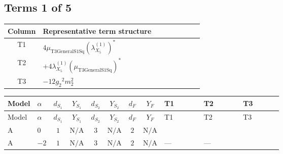 \documentclass[8pt]{article}
\begin{document}
\begin{landscape}
\subsection*{Terms 1 of 5}
\begin{center}
\begin{tabular}{@{}c >{\raggedright\arraybackslash}p{0.82\linewidth}@{}}
\toprule
Column & Representative term structure \\
\midrule
T1 & \(\displaystyle 4 {\mu_{\mathrm{T3GeneralS1Sq}}} \left({\lambda_{X_{5}}^{(1)}}\right)^{*}\) \\
\midrule
T2 & \(\displaystyle +4 {\lambda_{X_{5}}^{(1)}} \left({\mu_{\mathrm{T3GeneralS1Sq}}}\right)^{*}\) \\
\midrule
T3 & \(\displaystyle -12 {g_2}^2 {m_2^2}\) \\
\midrule
\bottomrule
\end{tabular}
\end{center}
\smallskip
\tiny
\begin{longtable}{@{}llcccccc >{\raggedright\arraybackslash}p{0.21\linewidth} >{\raggedright\arraybackslash}p{0.21\linewidth} >{\raggedright\arraybackslash}p{0.21\linewidth}@{}}
\toprule
Model & $\alpha$ & $d_{S_1}$ & $Y_{S_1}$ & $d_{S_2}$ & $Y_{S_2}$ & $d_F$ & $Y_F$ & T1 & T2 & T3 \\
\midrule
\endfirsthead
\toprule
Model & $\alpha$ & $d_{S_1}$ & $Y_{S_1}$ & $d_{S_2}$ & $Y_{S_2}$ & $d_F$ & $Y_F$ & T1 & T2 & T3 \\
\midrule
\endhead
A & $0$ & $1$ & $\text{N/A}$ & $3$ & $\text{N/A}$ & $2$ & $\text{N/A}$ & \scriptsize\adjustbox{max width=\linewidth}{$\begin{gathered} 4 {\mu_{\mathrm{T3GeneralS1Sq}}} \left({\lambda_{X_{5}}^{(1)}}\right)^{*}\end{gathered}$} & \scriptsize\adjustbox{max width=\linewidth}{$\begin{gathered} +4 {\lambda_{X_{5}}^{(1)}} \left({\mu_{\mathrm{T3GeneralS1Sq}}}\right)^{*}\end{gathered}$} & \scriptsize\adjustbox{max width=\linewidth}{$\begin{gathered} -12 {g_2}^2 {m_2^2}\end{gathered}$} \\
\midrule
A & $-2$ & $1$ & $\text{N/A}$ & $3$ & $\text{N/A}$ & $2$ & $\text{N/A}$ & --- & --- & \scriptsize\adjustbox{max width=\linewidth}{$\begin{gathered} -12 {g_2}^2 {m_2^2}\end{gathered}$} \\

\end{longtable}
\end{landscape}
\end{document}
